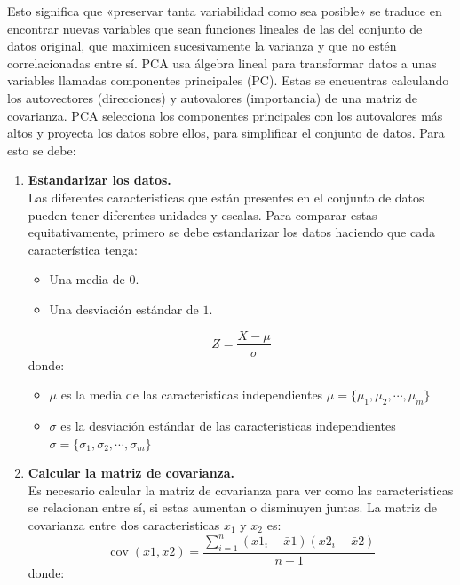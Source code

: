 \documentclass[spanish,11pt,letterpaper,oneside]{memoir}
\begin{document}
	Esto significa que «preservar tanta variabilidad como sea posible» se traduce en encontrar nuevas variables que sean funciones lineales de las del conjunto de datos original, que maximicen sucesivamente la varianza y que no estén correlacionadas entre sí. PCA usa álgebra lineal para transformar datos a unas variables llamadas componentes principales (PC). Estas se encuentras calculando los autovectores (direcciones) y autovalores (importancia) de una matriz de covarianza. PCA selecciona los componentes principales con los autovalores más altos y proyecta los datos sobre ellos, para simplificar el conjunto de datos. Para esto se debe: \\
	\begin{enumerate}
		\item \textbf{Estandarizar los datos.} \\
		Las diferentes caracteristicas que están presentes en el conjunto de datos pueden tener diferentes unidades y escalas. Para comparar estas equitativamente, primero se debe estandarizar los datos haciendo que cada característica tenga: 
		\begin{itemize}
			\item Una media de $0$.
			\item Una desviación estándar de $1$.
		\end{itemize}
		\begin{equation}
			\label{eq:standard}
			Z = \frac{\textit{X}-\mu}{\sigma}
		\end{equation}
		donde:
		\begin{itemize}
			\item $\mu$ es la media de las caracteristicas independientes $\mu = \{\mu_1, \mu_2,\dotsb,\mu_m\}$
			\item $\sigma$ es la desviación estándar de las caracteristicas independientes $\sigma = \{\sigma_1, \sigma_2,\dotsb,\sigma_m\}$
		\end{itemize}
		\item \textbf{Calcular la matriz de covarianza.}\\
		Es necesario calcular la matriz de covarianza para ver como las caracteristicas se relacionan entre sí, si estas aumentan o disminuyen juntas. La matriz de covarianza entre dos caracteristicas $x_1$ y $x_2$ es:
		\begin{equation}
			\label{eq:covarianza}
			\operatorname{cov}(x 1, x 2)=\frac{\sum_{i=1}^n\left(x 1_i-\bar{x} 1\right)\left(x 2_i-\bar{x} 2\right)}{n-1}
		\end{equation}
		donde: 
		\begin{itemize}

\end{itemize}
\end{enumerate}
\end{document}
